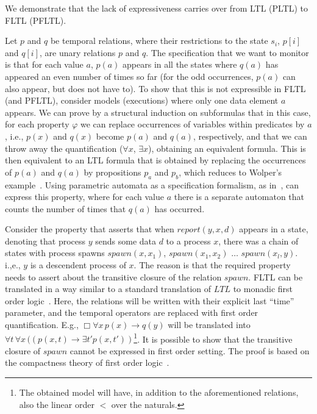 

We demonstrate that the lack of expressiveness
carries over from LTL (PLTL) to FLTL (PFLTL).

\vspace{1ex}
Let $p$ and $q$ be temporal relations, where their
restrictions to the state $s_i$, $p[i]$ and $q[i]$, are unary relations $p$ and $q$. The
specification that we want to monitor is that for each value
$a$, $p(a)$ appears in all the states where $q(a)$ has appeared an even number of times so far (for the odd occurrences, $p(a)$ can also appear, but does not have to). To show that this is not expressible in FLTL (and PFLTL),
consider models (executions) where only one data element $a$ appears. We can prove by a structural induction on subformulas
that in this case, for each property $\varphi$
we can replace occurrences of variables within
predicates by $a$, i.e., $p(x)$ and $q(x)$ become $p(a)$
and $q  (a )$, respectively, and that we can throw away
the quantification ($\forall x$, $\exists x$), obtaining
an equivalent formula. This is then equivalent to
an LTL formula that is obtained by replacing
the occurrences of $p(a)$ and $q(a)$ by propositions
$p_a$ and $p_b$, which reduces to Wolper's example~\cite{Wolper}.
Using parametric automata as a specification formalism, as in~\cite{Grum,havelund-rv-data-2018,Meredith2011,Reger2015}, can express this property, 
where for each value $a$ there is a separate automaton that counts the number of times that $q(a)$ has occurred.

\vspace{1ex}
Consider the property that asserts that when
$\mathit{report}(y , x, d)$ appears
in a state, denoting that  process 
$y$ sends some data $d$ to a process $x$,
there was a chain of states with process spawns
$\mathit{spawn}(x, x_1)$, $\mathit{spawn} (x_1, x_2)$ $\ldots$
$\mathit{spawn}(x_l , y)$. i.,e., $y$ is a descendent process of $x$. The reason
is that the required property needs to
assert about the transitive closure
of the relation $\mathit{spawn}$. 
FLTL can be translated in a way similar to a standard translation of $LTL$ to monadic first order logic~\cite{Thomas}. Here, the relations will be written with their explicit last ``time'' parameter, and the temporal operators are replaced with first order quantification.
E.g., $\Box \forall x \, p(x) \rightarrow q(y)$ will be translated into $\forall t \, \forall x \, ((p(x, t) \rightarrow \exists t' p(x, t') )$\footnote{The obtained model will have, in addition
to the aforementioned relations, also
the linear order $<$ over the naturals.}.
It is possible to show that the transitive closure of $\mathit{spawn}$ cannot be expressed in first order setting. The proof is based on the
compactness theory of first order logic~\cite{Flum}.

